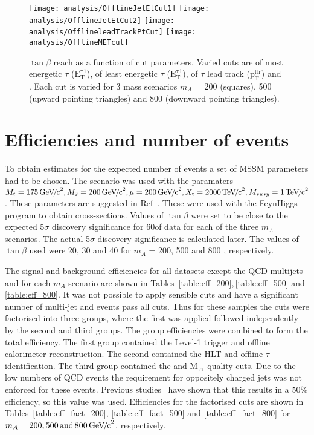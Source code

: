 \begin{figure}[tb]
\centering
\texttt{[image: analysis/OfflineJetEtCut1]}
\texttt{[image: analysis/OfflineJetEtCut2]}
\texttt{[image: analysis/OfflineleadTrackPtCut]}
\texttt{[image: analysis/OfflineMETcut]}
\caption{$\tan{\beta}$ reach as a function of cut parameters. Varied cuts are \ET of most energetic $\tau$ ($\mathrm{E_{T}^{\tau 1}}$), \ET of least energetic $\tau$ ($\mathrm{E_{T}^{\tau 1}}$), \PT of $\tau$ lead track ($\mathrm{p_{T}^{ltr}}$) and \MET. Each cut is varied for 3 mass scenarios $m_A$ = 200 (squares), 500 (upward pointing triangles) and 800 (downward pointing triangles)\GeVcc.\label{fig:cut_optimisation}}
\end{figure}

\section{Efficiencies and number of events}
To obtain estimates for the expected number of events a set of MSSM parameters had to be chosen. The \mhmax scenario was used with the paramaters $M_{t} = 175{\,\mathrm{Ge\hspace{-.08em}V\hspace{-0.16em}/\hspace{-0.08em}c}^\mathrm{2}}, M_{2} = 200{\,\mathrm{Ge\hspace{-.08em}V\hspace{-0.16em}/\hspace{-0.08em}c}^\mathrm{2}}, \mu = 200 {\,\mathrm{Ge\hspace{-.08em}V\hspace{-0.16em}/\hspace{-0.08em}c}^\mathrm{2}}, X_{\rm t} = 2000{\,\mathrm{Te\hspace{-.08em}V\hspace{-0.16em}/\hspace{-0.08em}c}^\mathrm{2}}, M_{susy} = 1{\,\mathrm{Te\hspace{-.08em}V\hspace{-0.16em}/\hspace{-0.08em}c}^\mathrm{2}}$. These parameters are suggested in Ref~\cite{citeulike:894146}. These were used with the FeynHiggs~\cite{citeulike:905609} program to obtain cross-sections. Values of $\tan{\beta}$ were set to be close to the expected 5$\sigma$ discovery significance for 60\fb of data for each of the three $m_A$ scenarios. The actual 5$\sigma$ discovery significance is calculated later. The values of $\tan{\beta}$ used were 20, 30 and 40 for $m_A$ = 200, 500 and 800 \GeVcc, respectively. 

The signal and background efficiencies for all datasets except the QCD multijets and \Zee for each $m_{A}$ scenario are shown in Tables~\ref{table:eff_200},\,\ref{table:eff_500} and \ref{table:eff_800}. It was not possible to apply sensible cuts and have a significant number of multi-jet and \Zee events pass all cuts. Thus for these samples the cuts were factorised into three groups, where the first was applied followed independently by the second and third groups. The group efficiencies were combined to form the total efficiency. The first group contained the Level-1 trigger and offline calorimeter reconstruction. The second contained the HLT and offline $\tau$ identification. The third group contained the \MET and $\mathrm{M_{\tau \tau}}$ quality cuts. Due to the low numbers of QCD events the requirement for oppositely charged jets was not enforced for these events. Previous studies~\cite{citeulike:903864} have shown that this results in a 50\% efficiency, so this value was used. Efficiencies for the factorised cuts are shown in Tables~\ref{table:eff_fact_200}, \ref{table:eff_fact_500} and \ref{table:eff_fact_800} for $m_{A} = 200, 500 \mathrm{\,and\,} 800{\,\mathrm{Ge\hspace{-.08em}V\hspace{-0.16em}/\hspace{-0.08em}c}^\mathrm{2}}$, respectively. 

